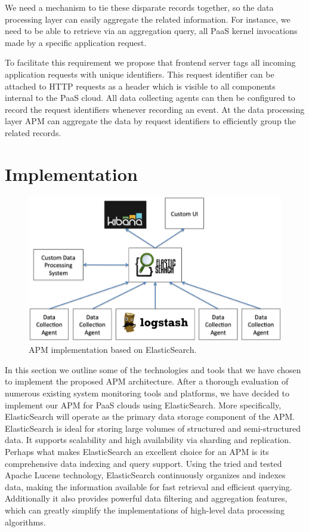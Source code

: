 \documentclass[11pt]{article}
\begin{document}
We need a mechanism to tie these disparate records together, so the data processing layer can easily
aggregate the related information. For instance, we need to be able to retrieve via an
aggregation query, all PaaS kernel invocations made by a specific application request.

To facilitate this requirement we propose that frontend server tags all incoming application requests 
with unique identifiers.
This request identifier can be attached to HTTP requests as a header which is visible to all components 
internal to the PaaS cloud. All data collecting agents can then be configured to record the request identifiers
whenever recording an event. At the data processing layer APM can aggregate the data by request identifiers
to efficiently group the related records.

\section{Implementation}
\begin{figure}
\centering
\includegraphics[scale=0.5]{apm_impl}
\caption{APM implementation based on ElasticSearch.}
\label{fig:apm_impl}
\end{figure}
In this section we outline some of the technologies and tools that we have chosen to implement the proposed
APM architecture.  After a thorough evaluation of numerous existing system monitoring tools and platforms, 
we have decided to implement our APM for PaaS clouds using ElasticSearch. More specifically, ElasticSearch
will operate as the primary data storage component of the APM. ElasticSearch is ideal for storing large volumes
of structured and semi-structured data. It supports scalability and high availability via sharding and replication.
Perhaps what makes ElasticSearch an excellent choice for an APM is its comprehensive data indexing and
query support. Using the tried and tested Apache Lucene technology, ElasticSearch continuously organizes
and indexes data, making the information available for fast retrieval and efficient querying. 
Additionally it also provides
powerful data filtering and aggregation features, which can greatly simplify the implementations of high-level
data processing algorithms.
\end{document}
